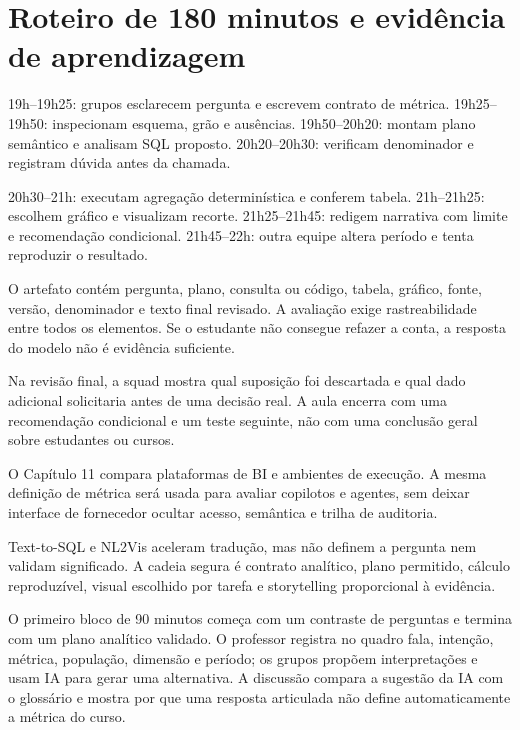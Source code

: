\section{Roteiro de 180 minutos e evidência de aprendizagem}

19h--19h25: grupos esclarecem pergunta e escrevem contrato de métrica. 19h25--19h50: inspecionam esquema, grão e ausências. 19h50--20h20: montam plano semântico e analisam SQL proposto. 20h20--20h30: verificam denominador e registram dúvida antes da chamada.

20h30--21h: executam agregação determinística e conferem tabela. 21h--21h25: escolhem gráfico e visualizam recorte. 21h25--21h45: redigem narrativa com limite e recomendação condicional. 21h45--22h: outra equipe altera período e tenta reproduzir o resultado.

O artefato contém pergunta, plano, consulta ou código, tabela, gráfico, fonte, versão, denominador e texto final revisado. A avaliação exige rastreabilidade entre todos os elementos. Se o estudante não consegue refazer a conta, a resposta do modelo não é evidência suficiente.

Na revisão final, a squad mostra qual suposição foi descartada e qual dado adicional solicitaria antes de uma decisão real. A aula encerra com uma recomendação condicional e um teste seguinte, não com uma conclusão geral sobre estudantes ou cursos.

O Capítulo 11 compara plataformas de BI e ambientes de execução. A mesma definição de métrica será usada para avaliar copilotos e agentes, sem deixar interface de fornecedor ocultar acesso, semântica e trilha de auditoria.

\begin{SummaryBox}
Text-to-SQL e NL2Vis aceleram tradução, mas não definem a pergunta nem validam significado. A cadeia segura é contrato analítico, plano permitido, cálculo reproduzível, visual escolhido por tarefa e storytelling proporcional à evidência.
\end{SummaryBox}



O primeiro bloco de 90 minutos começa com um contraste de perguntas e termina com um plano analítico validado. O professor registra no quadro fala, intenção, métrica, população, dimensão e período; os grupos propõem interpretações e usam IA para gerar uma alternativa. A discussão compara a sugestão da IA com o glossário e mostra por que uma resposta articulada não define automaticamente a métrica do curso.

